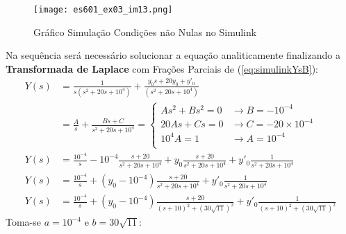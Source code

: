 \documentclass{article}
\begin{document}
\begin{resolution}
                    \begin{figure}[H]
                        \centering
                        \texttt{[image: es601\_ex03\_im13.png]}
                        \caption{Gráfico Simulação Condições não Nulas no Simulink}
                    \end{figure}
                Na sequência será necessário solucionar a equação analiticamente finalizando a \textbf{Transformada de Laplace} com Frações Parciais de (\ref{eq:simulinkYsB}):
                    \begin{align}
                        Y(s) &= 
                                \frac{1}{s(s^2 + 20s + 10^4)} + 
                                \frac{y_{0}s + 20y_{0} + y'_{0}}{(s^2 + 20s + 10^4)}\nonumber\\[1.5mm]
                             &= \frac{A}{s} + \frac{Bs + C}{s^2 + 20s + 10^4} = 
                             \begin{cases}
                                 As^2 + Bs^2 = 0 &\rightarrow\boxed{B = -10^{-4}}\\
                                 20As + Cs   = 0 &\rightarrow\boxed{C = -20\times10^{-4}}\\
                                 10^4A       = 1 &\rightarrow\boxed{A = 10^{-4}}\\
                             \end{cases}\nonumber\\[1.5mm]
                        Y(s) &= 
                                \frac{10^{-4}}{s} - 
                                10^{-4}\frac{s+20}{s^2 + 20s + 10^4} + 
                                y_{0}  \frac{s+20}{s^2 + 20s + 10^4} + 
                                y'_{0} \frac{1}{s^2 + 20s + 10^4}\nonumber\\
                        Y(s) &= 
                                \frac{10^{-4}}{s} + 
                                (y_{0} - 10^{-4})\frac{s+20}{s^2 + 20s + 10^4} + 
                                y'_{0} \frac{1}{s^2 + 20s + 10^4}\nonumber\\
                        Y(s) &= 
                                \frac{10^{-4}}{s} + 
                                (y_{0} - 10^{-4})\frac{s+20}{(s+10)^2 + (30\sqrt{11})^2} + 
                                y'_{0} \frac{1}{(s+10)^2 + (30\sqrt{11})^2}\nonumber
                    \end{align}
                Toma-se $a = 10^{-4}$ e $b = 30\sqrt{11}$:
                    \begin{align}

\end{align}
\end{resolution}
\end{document}
